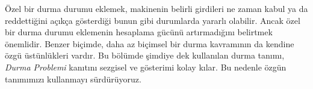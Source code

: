 \documentclass[../../../include/open-logic-section]{subfiles}
\begin{document}
\begin{explain}
Özel bir durma durumu eklemek, makinenin belirli girdileri ne zaman kabul ya
da reddettiğini açıkça gösterdiği bunun gibi durumlarda yararlı olabilir.
Ancak özel bir durma durumu eklemenin hesaplama gücünü artırmadığını belirtmek
önemlidir. Benzer biçimde, daha az biçimsel bir durma kavramının da kendine
özgü üstünlükleri vardır. Bu bölümde şimdiye dek kullanılan durma tanımı,
\emph{Durma Problemi} kanıtını sezgisel ve gösterimi kolay kılar. Bu nedenle
özgün tanımımızı kullanmayı sürdürüyoruz.
\end{explain}
\end{document}
